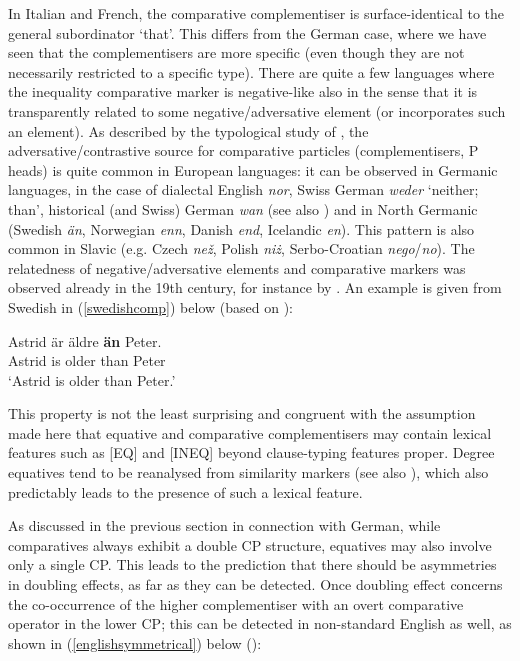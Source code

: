 In Italian and French, the comparative complementiser is surface-identical to the general subordinator `that'. This differs from the German case, where we have seen that the complementisers are more specific (even though they are not necessarily restricted to a specific type). There are quite a few languages where the inequality comparative marker is negative-like also in the sense that it is transparently related to some negative/adversative element (or incorporates such an element). As described by the typological study of \citet[47--121]{stolz2013}, the adversative/contrastive source for comparative particles (complementisers, P heads) is quite common in European languages: it can be observed in Germanic languages, in the case of dialectal English \textit{nor}, Swiss German \textit{weder} `neither; than', historical (and Swiss) German \textit{wan} (see also \citealt{jaeger2018}) and in North Germanic (Swedish \textit{\"an}, Norwegian \textit{enn}, Danish \textit{end}, Icelandic \textit{en}). This pattern is also common in Slavic (e.g. Czech \textit{ne\v{z}}, Polish \textit{ni\.{z}}, Serbo-Croatian \textit{nego}/\textit{no}). The relatedness of negative/adversative elements and comparative markers was observed already in the 19th century, for instance by \citet{ziemer1884}. An example is given from Swedish in (\ref{swedishcomp}) below (based on \citealt[268]{bacskaiatkaribaudisch2018}):

\ea \gll	Astrid är	äldre	\textbf{än} Peter. \label{swedishcomp}\\
Astrid is	older	than Peter\\
\glt `Astrid is older than Peter.'
\z

This property is not the least surprising and congruent with the assumption made here that equative and comparative complementisers may contain lexical features such as [EQ] and [INEQ] beyond clause-typing features proper. Degree equatives tend to be reanalysed from similarity markers (see also \citealt{jaeger2018}), which also predictably leads to the presence of such a lexical feature.

As discussed in the previous section in connection with German, while comparatives always exhibit a double CP structure, equatives may also involve only a single CP. This leads to the prediction that there should be asymmetries in doubling effects, as far as they can be detected. Once doubling effect concerns the co-occurrence of the higher complementiser with an overt comparative operator in the lower CP; this can be detected in non-standard English as well, as shown in (\ref{englishsymmetrical}) below (\citealt{bacskaiatkari2018langsci}):\largerpage

